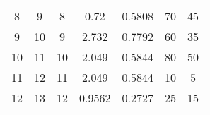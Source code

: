 \begin{table}
\begin{adjustbox}{width=1.2\textwidth,center=\textwidth}
\begin{tabular}{ccccccc}
8                                                         & 9                                                           & 8                                                   & 0.72                                                                       & 0.5808                                                                    & 70                                                                          & 45                                                                               \\
9                                                         & 10                                                          & 9                                                   & 2.732                                                                      & 0.7792                                                                    & 60                                                                          & 35                                                                               \\
10                                                        & 11                                                          & 10                                                  & 2.049                                                                      & 0.5844                                                                    & 80                                                                          & 50                                                                               \\
11                                                        & 12                                                          & 11                                                  & 2.049                                                                      & 0.5844                                                                    & 10                                                                          & 5                                                                                \\
12                                                        & 13                                                          & 12                                                  & 0.9562                                                                     & 0.2727                                                                    & 25                                                                          & 15                                                                               \\

\end{tabular}
\end{adjustbox}
\end{table}
